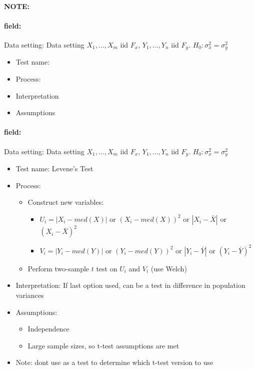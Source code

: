 \documentclass[12pt]{article}
\newenvironment{note}{\paragraph{NOTE:}}{}
\newenvironment{field}{\paragraph{field:}}{}
\begin{document}
\begin{note}
  \begin{field}
    Data setting: Data setting $X_1, \ldots , X_m$ iid $F_x$, $Y_1, \ldots, Y_n$ iid $F_y$. $H_0: \sigma_x^2 = \sigma_y^2$
    \begin{itemize}
      \item Test name:
      \item Process:
      \item Interpretation
      \item Assumptions
    \end{itemize}
  \end{field}
  \begin{field}
    Data setting: Data setting $X_1, \ldots , X_m$ iid $F_x$, $Y_1, \ldots, Y_n$ iid $F_y$. $H_0: \sigma_x^2 = \sigma_y^2$
    \begin{itemize}
      \item Test name: Levene's Test
      \item Process:
      \begin{itemize}
        \item Construct new variables:
        \begin{itemize}
          \item $U_i = |X_i - med(X)|$ or $(X_i - med(X))^2$ or $|X_i - \bar{X}|$ or $(X_i - \bar{X})^2$
          \item $V_i = |Y_i - med(Y)|$ or $(Y_i - med(Y))^2$ or $|Y_i - \bar{Y}|$ or $(Y_i - \bar{Y})^2$
        \end{itemize}
        \item Perform two-sample $t$ test on $U_i$ and $V_i$ (use Welch)
      \end{itemize}
      \item Interpretation: If last option used, can be a test in difference in population variances
      \item Assumptions:
      \begin{itemize}
        \item Independence
        \item Large sample sizes, so t-test assumptions are met
      \end{itemize}
      \item Note: dont use as a test to determine which t-test version to use
    \end{itemize}
  \end{field}
\end{note}
\end{document}
